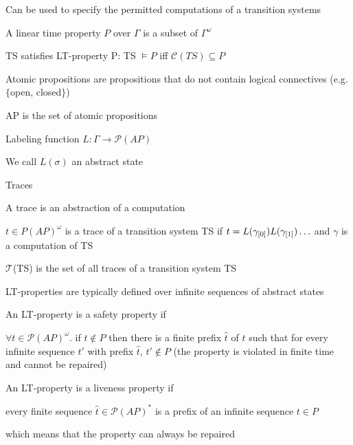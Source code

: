 	\enumstart
		\item Can be used to specify the permitted computations of a transition systems
		\item A linear time property $P$ over $\Gamma$ is a subset of $\Gamma^\omega$
		\item TS satisfies LT-property P: TS $\vDash P$ iff $\mathcal{C}(TS) \subseteq P$
	\enumend
	\item Atomic propositions are propositions that do not contain logical connectives (e.g. $\{$open, closed$\}$)
	\enumstart
		\item AP is the set of atomic propositions
		\item Labeling function $L: \Gamma \rightarrow \mathcal{P}(AP)$
		\item We call $L(\sigma)$ an abstract state
	\enumend
	\item Traces
	\enumstart
		\item A trace is an abstraction of a computation
		\item $t \in P(AP)^\omega$ is a trace of a transition system TS if $t = L(\gamma_{[0]})L(\gamma_{[1]})\mathellipsis$ and $\gamma$ is a computation of TS
		\item $\mathcal{T}$(TS) is the set of all traces of a transition system TS
		\item LT-properties are typically defined over infinite sequences of abstract states
	\enumend
	\item An LT-property is a safety property if
	\enumstart
		\item $\forall t \in \mathcal{P}(AP)^\omega$. if $t \notin P$ then there is a finite prefix $\hat{t}$ of $t$ such that for every infinite sequence $t'$ with prefix $\hat{t}$, $t' \notin P$ (the property is violated in finite time and cannot be repaired)
	\enumend
	\item An LT-property is a liveness property if
	\enumstart
		\item every finite sequence $\hat{t} \in \mathcal{P}(AP)^*$ is a prefix of an infinite sequence $t \in P$
		\item which means that the property can always be repaired
	\enumend
\enumend
